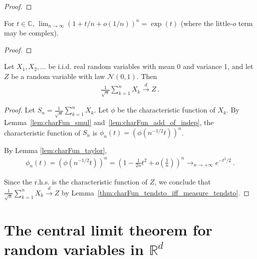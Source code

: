 \begin{proof}\leanok
{}
\end{proof}

\begin{lemma}\label{lem:tendsto_pow_exp_of_isLittleO}
\leanok
{}
For $t\in\mathbb{C}$, $\lim_{n\to\infty}(1+t/n+o(1/n))^n=\exp(t)$ (where the little-$o$ term may be complex).
\end{lemma}

\begin{proof}\leanok
\end{proof}

\begin{theorem}\label{thm:clt}
    \leanok
Let $X_1, X_2, \ldots$ be i.i.d. real random variables with mean 0 and variance 1, and let $Z$ be a random variable with law $\mathcal N(0,1)$. Then
\begin{align*}
\frac{1}{\sqrt{n}}\sum_{k=1}^n X_k \xrightarrow{d} Z \: .
\end{align*}
\end{theorem}

\begin{proof}
\leanok
Let $S_n = \frac{1}{\sqrt{n}}\sum_{k=1}^n X_k$. Let $\phi$ be the characteristic function of $X_k$. By Lemma~\ref{lem:charFun_smul} and~\ref{lem:charFun_add_of_indep}, the characteristic function of $S_n$ is $\phi_n(t) = (\phi(n^{-1/2}t))^n$.

By Lemma \ref{lem:charFun_taylor},
\begin{align*}
\phi_n(t) = (\phi(n^{-1/2}t))^n = \left(1 - \frac{1}{2n}t^2 + o(\frac{1}{n})\right)^n \to_{n \to +\infty} e^{-t^2/2} \: .
\end{align*}

Since the r.h.s. is the characteristic function of $Z$, we conclude that $\frac{1}{\sqrt{n}}\sum_{k=1}^n X_k \xrightarrow{d} Z$ by Lemma~\ref{thm:charFun_tendsto_iff_measure_tendsto}.
\end{proof}


\section{The central limit theorem for random variables in $\mathbb{R}^d$}

